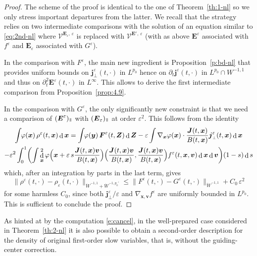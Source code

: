 \documentclass[JEP,XML,SOM,Unicode]{cedram}
\let\mathcal\mathscr
\newcommand{\sperp}{{\scriptscriptstyle\perp}}
\let\eps\varepsilon
\let\d\partial
\DeclareMathOperator\dD{d}\let\dd\dD
\theoremstyle{plain}
\theoremstyle{definition}
\newcommand\bE{{\boldsymbol E}}
\newcommand\bF{{\boldsymbol F}}
\newcommand\bJ{{\boldsymbol J}}
\newcommand\bZ{{\boldsymbol Z}}
\newcommand\bfj{{\boldsymbol j}}
\newcommand\bfv{{\boldsymbol v}}
\newcommand\bfx{{\boldsymbol x}}
\newcommand\bfy{{\boldsymbol y}}
\newcommand\cV{{\mathcal V}}
\newcommand{\mypar}{{\mkern3mu\vphantom{\perp}\vrule depth 0pt\mkern2mu\vrule depth 0pt\mkern3mu}}
\begin{document}
\begin{proof}
The scheme of the proof is identical to the one of Theorem~\ref{th:1-nl} so we only stress important departures from the latter. We recall that the strategy relies on two intermediate comparisons with the solution of an equation similar to \eqref{eq:2nd-nl} where $\cV^{\bE_\eps,\,\eps}$ is replaced with $\cV^{\bE^\eps,\,\eps}$ (with as above $\bE^\eps$ associated with $f^\eps$ and $\bE_\eps$ associated with $G^\eps$).

In the comparison with $F^\eps$, the main new ingredient is Proposition~\ref{p:bd-nl} that provides uniform bounds on $\bfj_\sperp^\eps(t,\cdot)$ in $L^{p_0}$ hence on $\d_t\bfj^\eps(t,\cdot)$ in $L^{p_0}\cap W^{-1,1}$ and thus on $\d_t^2\bE^\eps(t,\cdot)$ in $L^\infty$. This allows to derive the first intermediate comparison from Proposition~\ref{prop:4.9}.

In the comparison with $G^\eps$, the only significantly new constraint is that we need a comparison of $(\bE^\eps)_\mypar$ with $(\bE_\eps)_\mypar$ at order $\eps^2$. This follows from the identity
\begin{multline}\label{e:cancel}
\int\hspace*{-1mm} \varphi(\bfx)\,\rho^\eps(t,\bfx)\dD\bfx
=
\int\hspace*{-1mm} \varphi(\bfy)\, \bF^\eps(t,\bZ)\dD\bZ
-\eps\int \nabla_\bfx\varphi(\bfx)\cdot\frac{\bJ(t,\bfx)}{B(t,\bfx)}\bfj_\sperp^\eps(t,\bfx)\dD\bfx\\
-\eps^2\int_0^1\biggl(
\int \dD_\bfx^2\varphi\Bigl(\bfx+\eps\,s\frac{\bJ(t,\bfx)\bfv}{B(t,\bfx)}\Bigr)\Bigl(\frac{\bJ(t,\bfx)\bfv}{B(t,\bfx)},\frac{\bJ(t,\bfx)\bfv}{B(t,\bfx)}\Bigr)
f^\eps(t,\bfx,\bfv)\dD \bfx\dD\bfv\biggr)(1-s)\dD s
\end{multline}
which, after an integration by parts in the last term, gives
\[
\|\rho^\eps(t,\cdot)-\rho_\eps(t,\cdot)\|_{\dot{W}^{-1,1}+\dot{W}^{-1,p_0'}}
\leq
\|F^\eps(t,\cdot)-G^\eps(t,\cdot)\|_{\dot{W}^{-1,1}}
+C_0\,\eps^2
\]
for some harmless $C_0$, since both $\bfj_\sperp^\eps/\eps$ and $\nabla_{\bfx,\bfv}f^\eps$ are uniformly bounded in $L^{p_0}$. This is sufficient to conclude the proof.
\end{proof}

As hinted at by the computation \eqref{e:cancel}, in the well-prepared case considered in Theorem~\ref{th:2-nl} it is also possible to obtain a second-order description for the density of original first-order slow variables, that is, without the guiding-center correction.
\end{document}
